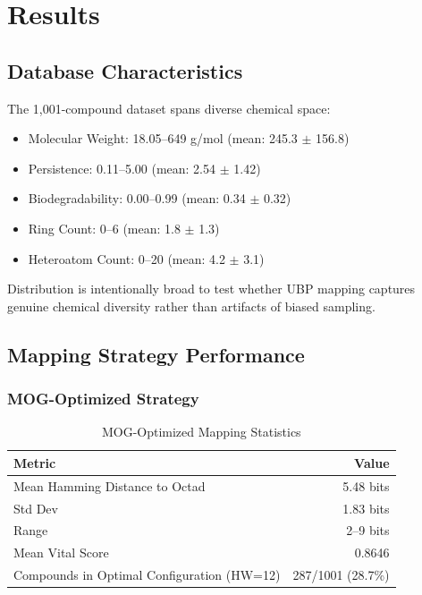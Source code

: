 \documentclass[11pt,letterpaper]{article}
\begin{document}
\section{Results}

\subsection{Database Characteristics}

The 1,001-compound dataset spans diverse chemical space:

\begin{itemize}
    \item Molecular Weight: 18.05--649 g/mol (mean: 245.3 $\pm$ 156.8)
    \item Persistence: 0.11--5.00 (mean: 2.54 $\pm$ 1.42)
    \item Biodegradability: 0.00--0.99 (mean: 0.34 $\pm$ 0.32)
    \item Ring Count: 0--6 (mean: 1.8 $\pm$ 1.3)
    \item Heteroatom Count: 0--20 (mean: 4.2 $\pm$ 3.1)
\end{itemize}

Distribution is intentionally broad to test whether UBP mapping captures genuine chemical diversity rather than artifacts of biased sampling.

\subsection{Mapping Strategy Performance}

\subsubsection{MOG-Optimized Strategy}

\begin{table}[H]
\centering
\caption{MOG-Optimized Mapping Statistics}
\begin{tabular}{lr}
\toprule
\textbf{Metric} & \textbf{Value} \\
\midrule
Mean Hamming Distance to Octad & 5.48 bits \\
Std Dev & 1.83 bits \\
Range & 2--9 bits \\
Mean Vital Score & 0.8646 \\
Compounds in Optimal Configuration (HW=12) & 287/1001 (28.7\%) \\
\bottomrule
\end{tabular}
\end{table}
\end{document}
